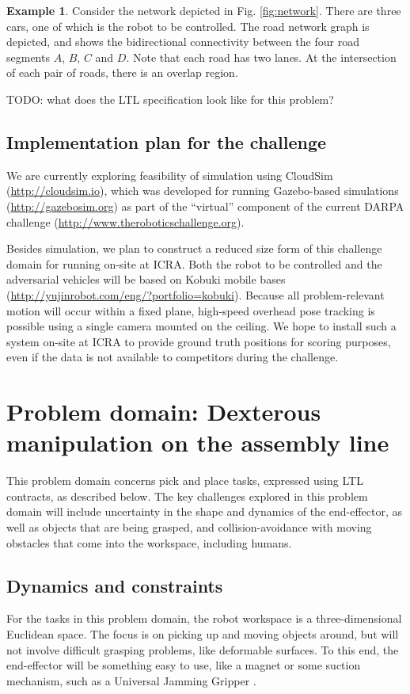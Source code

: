 \documentclass{amsart}
\theoremstyle{definition}
\newtheorem{example}{Example}[section]
\begin{document}
\begin{example}
Consider the network depicted in Fig. \ref{fig:network}. There are three cars,
one of which is the robot to be controlled. The road network graph is depicted,
and shows the bidirectional connectivity between the four road segments $A$,
$B$, $C$ and $D$. Note that each road has two lanes. At the intersection of each
pair of roads, there is an overlap region.
\end{example}

TODO: what does the LTL specification look like for this problem?

\subsection{Implementation plan for the challenge}

We are currently exploring feasibility of simulation using CloudSim
(\url{http://cloudsim.io}), which was developed for running Gazebo-based
simulations (\url{http://gazebosim.org}) as part of the ``virtual'' component of
the current DARPA challenge (\url{http://www.theroboticschallenge.org}).

Besides simulation, we plan to construct a reduced size form of this challenge
domain for running on-site at ICRA.  Both the robot to be controlled and the
adversarial vehicles will be based on Kobuki mobile bases
(\url{http://yujinrobot.com/eng/?portfolio=kobuki}).  Because all
problem-relevant motion will occur within a fixed plane, high-speed overhead
pose tracking is possible using a single camera mounted on the ceiling.  We hope
to install such a system on-site at ICRA to provide ground truth positions for
scoring purposes, even if the data is not available to competitors during the
challenge.

\section{Problem domain: Dexterous manipulation on the assembly line}\label{sec:dexterousmanip}

This problem domain concerns pick and place tasks, expressed using LTL
contracts, as described below. The key challenges explored in this problem
domain will include uncertainty in the shape and dynamics of the end-effector,
as well as objects that are being grasped, and collision-avoidance with moving
obstacles that come into the workspace, including humans.

\subsection{Dynamics and constraints}
For the tasks in this problem domain, the robot workspace is a three-dimensional
Euclidean space. The focus is on picking up and moving objects around, but will not 
involve difficult grasping problems, like deformable surfaces. To this end, the end-effector
will be something easy to use, like a magnet or some suction mechanism, such as a 
Universal Jamming Gripper \cite{AmendBRJL12}.
\end{document}
